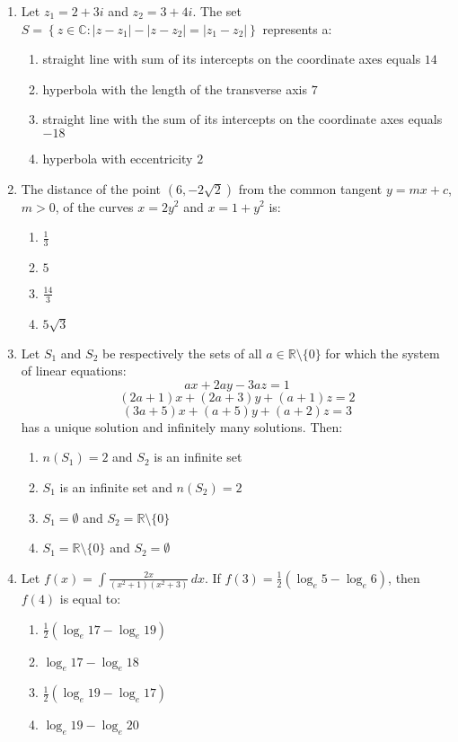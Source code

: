 \documentclass[journal,12pt,onecolumn]{IEEEtran}
\theoremstyle{remark}
\begin{document}
\begin{enumerate}
\item Let $z_1 = 2 + 3i$ and $z_2 = 3 + 4i$. The set 
$S = \left\{ z \in \mathbb{C} : |z - z_1| - |z - z_2| = |z_1 - z_2| \right\}$
represents a:
\begin{enumerate}
    \item straight line with sum of its intercepts on the coordinate axes equals $14$
    \item hyperbola with the length of the transverse axis $7$
    \item straight line with the sum of its intercepts on the coordinate axes equals $-18$
    \item hyperbola with eccentricity $2$
\end{enumerate}
\item The distance of the point $\left( 6, -2\sqrt{2} \right)$ from the common tangent $y = mx + c$, $m > 0$, of the curves $x = 2y^2$ and $x = 1 + y^2$ is:
\begin{enumerate}
    \item $\frac{1}{3}$
    \item $5$
    \item $\frac{14}{3}$
    \item $5\sqrt{3}$
\end{enumerate}

\item Let $S_1$ and $S_2$ be respectively the sets of all $a \in \mathbb{R} \setminus \{0\}$ for which the system of linear equations:
\[
ax + 2ay - 3az = 1
\]
\[
(2a + 1)x + (2a + 3)y + (a + 1)z = 2
\]
\[
(3a + 5)x + (a + 5)y + (a + 2)z = 3
\]
has a unique solution and infinitely many solutions. Then:
\begin{enumerate}
    \item $n(S_1) = 2$ and $S_2$ is an infinite set
    \item $S_1$ is an infinite set and $n(S_2) = 2$
    \item $S_1 = \emptyset$ and $S_2 = \mathbb{R} \setminus \{0\}$
    \item $S_1 = \mathbb{R} \setminus \{0\}$ and $S_2 = \emptyset$
\end{enumerate}
\item Let $f(x) = \int \frac{2x}{(x^2 + 1)(x^2 + 3)} \, dx$. If $f(3) = \frac{1}{2} (\log_e 5 - \log_e 6)$, then $f(4)$ is equal to:
\begin{enumerate}
    \item $\frac{1}{2} (\log_e 17 - \log_e 19)$
    \item $\log_e 17 - \log_e 18$
    \item $\frac{1}{2} (\log_e 19 - \log_e 17)$
    \item $\log_e 19 - \log_e 20$
\end{enumerate}





    

\end{enumerate}
\end{document}
